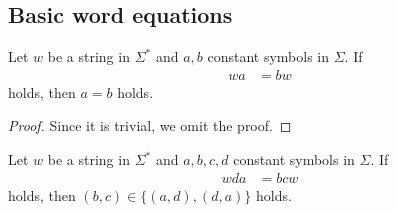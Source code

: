 \subsection{Basic word equations}\label{subsec:basiceq}

\newcommand{\pair}[2]{(#1,#2)}

\begin{prop}\label{prop:repstring_origin}
  Let $w$ be a string in $\Sigma^{\ast}$ 
 and $a,b$ constant symbols in $\Sigma$.
  If
  \begin{align}
  wa & = bw \label{eq:repstring_origin}
  \end{align}
  holds, then $a = b$ holds.
\end{prop}

\begin{proof}
Since it is trivial, we omit the proof.
\end{proof}

\begin{prop}\label{prop:repstring_base}
Let $w$ be a string in $\Sigma^{\ast}$ 
and $a,b,c,d$ constant symbols in $\Sigma$.
If
\begin{align}
wda & = bcw \label{eq:repstring_base}
\end{align}
holds, then $\pair{b}{c} \in \{\pair{a}{d}, \pair{d}{a}\}$ holds.
\end{prop}

